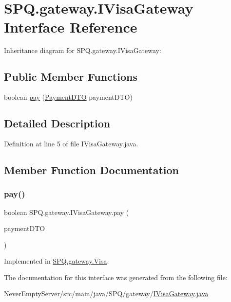 \hypertarget{interface_s_p_q_1_1gateway_1_1_i_visa_gateway}{}\section{S\+P\+Q.\+gateway.\+I\+Visa\+Gateway Interface Reference}
\label{interface_s_p_q_1_1gateway_1_1_i_visa_gateway}


Inheritance diagram for S\+P\+Q.\+gateway.\+I\+Visa\+Gateway\+:
\subsection*{Public Member Functions}
\begin{DoxyCompactItemize}
\item 
boolean \mbox{\hyperlink{interface_s_p_q_1_1gateway_1_1_i_visa_gateway_adb8feee5084ca3e28c61360719a24c7a}{pay}} (\mbox{\hyperlink{class_s_p_q_1_1dto_1_1_payment_d_t_o}{Payment\+D\+TO}} payment\+D\+TO)
\end{DoxyCompactItemize}


\subsection{Detailed Description}


Definition at line 5 of file I\+Visa\+Gateway.\+java.



\subsection{Member Function Documentation}
\mbox{\label{interface_s_p_q_1_1gateway_1_1_i_visa_gateway_adb8feee5084ca3e28c61360719a24c7a}} 
\subsubsection{\texorpdfstring{pay()}{pay()}}
{\footnotesize\ttfamily boolean S\+P\+Q.\+gateway.\+I\+Visa\+Gateway.\+pay (\begin{DoxyParamCaption}\item[{\mbox{\hyperlink{class_s_p_q_1_1dto_1_1_payment_d_t_o}{Payment\+D\+TO}}}]{payment\+D\+TO }\end{DoxyParamCaption})}



Implemented in \mbox{\hyperlink{class_s_p_q_1_1gateway_1_1_visa_a0ecda0414a0685174ec12ae96c8d3a68}{S\+P\+Q.\+gateway.\+Visa}}.



The documentation for this interface was generated from the following file\+:\begin{DoxyCompactItemize}
\item 
Never\+Empty\+Server/src/main/java/\+S\+P\+Q/gateway/\mbox{\hyperlink{_i_visa_gateway_8java}{I\+Visa\+Gateway.\+java}}\end{DoxyCompactItemize}
